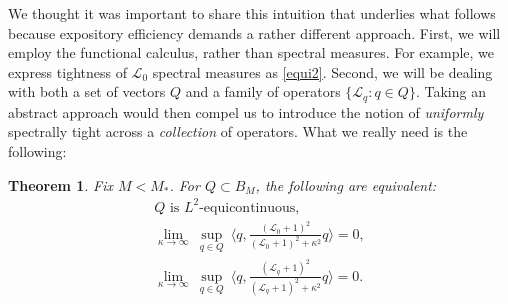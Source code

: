 \documentclass{amsart}
\numberwithin{equation}{section}
\newtheorem{theorem}{Theorem}[section]
\theoremstyle{definition}
\newtheorem{definition}[theorem]{Definition}
\newcommand{\Lc}{\mathcal{L}}
\begin{document}
We thought it was important to share this intuition that underlies what follows because expository efficiency demands a rather different approach.  First, we will employ the functional calculus, rather than spectral measures.  For example, we express tightness of $\Lc_0$ spectral measures as \eqref{equi2}.  Second, we will be dealing with both a set of vectors $Q$ and a family of operators $\{\Lc_q : q\in Q\}$.  Taking an abstract approach would then compel us to introduce the notion of \emph{uniformly} spectrally tight across a \emph{collection} of operators.  What we really need is the following:  %
%
%




\begin{theorem}\label{T:equi-c}
Fix $M<M_*$.   For $Q \subset B_M$, the following are equivalent:
\begin{gather}
\label{equi1} \text{$Q$ is $L^2$-equicontinuous}, \\
\label{equi2} \lim_{\kappa\to\infty}\ \sup_{q\in Q}\ \bigl\langle q, \tfrac{(\Lc_0+1)^2}{(\Lc_0+1)^2+\kappa^2} q \bigr\rangle =0, \\
\label{equi3} \lim_{\kappa\to\infty}\ \sup_{q\in Q}\ \bigl\langle q, \tfrac{(\Lc_q+1)^2}{(\Lc_q+1)^2+\kappa^2} q \bigr\rangle =0.
\end{gather}
\end{theorem}
\end{document}
